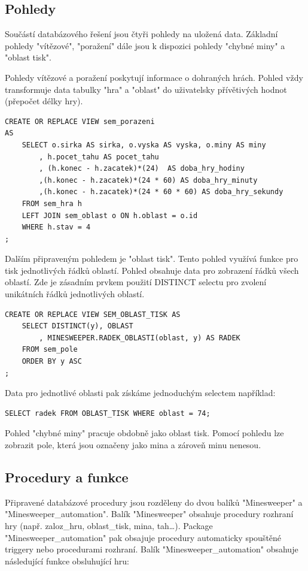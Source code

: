 \documentclass[12pt, a4paper]{article}
\begin{document}
\subsection{Pohledy}

Součástí databázového řešení jsou čtyři pohledy na uložená data. Základní pohledy "vítězové", "poražení" dále jsou k dispozici pohledy "chybné miny" a "oblast tisk".

Pohledy vítězové a poražení poskytují informace o dohraných hrách. Pohled vždy transformuje data tabulky "hra" a "oblast" do uživatelsky přívětivých hodnot (přepočet délky hry). 

\begin{verbatim}
CREATE OR REPLACE VIEW sem_porazeni 
AS
    SELECT o.sirka AS sirka, o.vyska AS vyska, o.miny AS miny
        , h.pocet_tahu AS pocet_tahu
        , (h.konec - h.zacatek)*(24)  AS doba_hry_hodiny
        ,(h.konec - h.zacatek)*(24 * 60) AS doba_hry_minuty
        ,(h.konec - h.zacatek)*(24 * 60 * 60) AS doba_hry_sekundy
    FROM sem_hra h
    LEFT JOIN sem_oblast o ON h.oblast = o.id
    WHERE h.stav = 4
;
\end{verbatim}

Dalším připraveným pohledem je "oblast tisk". Tento pohled využívá funkce pro tisk jednotlivých řádků oblastí. Pohled obsahuje data pro zobrazení řádků všech oblastí. Zde je zásadním prvkem použití DISTINCT selectu pro zvolení unikátních řádků jednotlivých oblastí.

\begin{verbatim}
CREATE OR REPLACE VIEW SEM_OBLAST_TISK AS
	SELECT DISTINCT(y), OBLAST
		, MINESWEEPER.RADEK_OBLASTI(oblast, y) AS RADEK
	FROM sem_pole
	ORDER BY y ASC
;
\end{verbatim}

Data pro jednotlivé oblasti pak získáme jednoduchým selectem například:
\begin{verbatim}
SELECT radek FROM OBLAST_TISK WHERE oblast = 74;
\end{verbatim}

Pohled "chybné miny" pracuje obdobně jako oblast tisk. Pomocí pohledu lze zobrazit pole, která jsou označeny jako mina a zároveň minu nenesou.

\subsection{Procedury a funkce}

Připravené databázové procedury jsou rozděleny do dvou balíků "Minesweeper" a "Minesweeper\_automation". Balík "Minesweeper" obsahuje procedury rozhraní hry (např. zaloz\_hru, oblast\_tisk, mina, tah\ldots). Package "Minesweeper\_automation" pak obsajuje procedury automaticky spouštěné triggery nebo procedurami rozhraní. Balík "Minesweeper\_automation" obsahuje následující funkce obsluhující hru:
\end{document}
